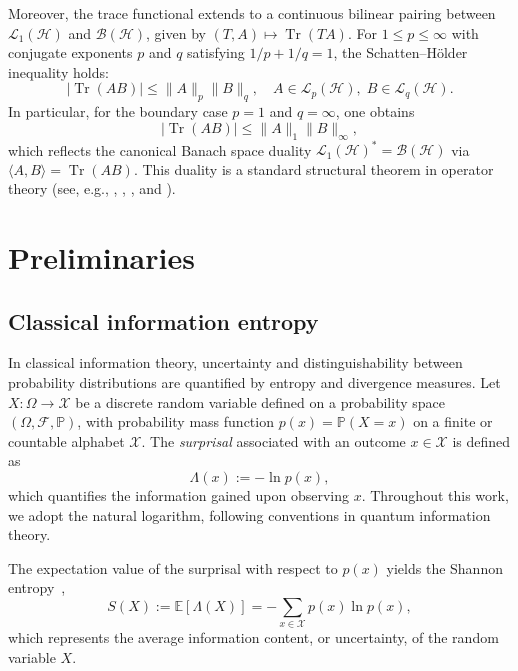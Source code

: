 \documentclass[a4paper, amsfonts, amssymb, amsmath, reprint, showkeys, nofootinbib, twoside, aps, pra]{revtex4-2}
\theoremstyle{definition}
\begin{document}
Moreover, the trace functional extends to a continuous bilinear pairing
between $\mathcal{L}_1(\mathcal{H})$ and $\mathcal{B}(\mathcal{H})$, given by $(T,A) \longmapsto \operatorname{Tr}(TA)$. 
For $1 \le p \le \infty$ with conjugate exponents $p$ and $q$ satisfying $1/p + 1/q = 1$, 
the Schatten--Hölder inequality holds:
\begin{equation}
    |\operatorname{Tr}(AB)| \le \|A\|_p \|B\|_q, \quad A \in \mathcal{L}_p(\mathcal{H}), \; B \in \mathcal{L}_q(\mathcal{H}).
\end{equation}
In particular, for the boundary case $p=1$ and $q=\infty$, one obtains
\begin{equation}
    |\operatorname{Tr}(AB)| \le \|A\|_1 \|B\|_\infty,
\end{equation}
which reflects the canonical Banach space duality $\mathcal{L}_1(\mathcal{H})^* = \mathcal{B}(\mathcal{H})$ via 
$\langle A,B\rangle = \operatorname{Tr}(AB)$. This duality is a standard structural theorem in operator theory 
(see, e.g., \cite[Theorem VI.26]{ReedSimon1980}, \cite[Theorem 1.4]{RecentSchwarzTraceIneq}, \cite{Kittaneh1985}, and \cite{Watrous2018}).

\section{Preliminaries} \label{pre}
\subsection{Classical information entropy}

In classical information theory, uncertainty and distinguishability between probability distributions are quantified by entropy and divergence measures. 
Let $X : \Omega \to \mathcal{X}$ be a discrete random variable defined on a probability space $(\Omega,\mathcal{F},\mathbb{P})$, with probability mass function $p(x)=\mathbb{P}(X=x)$ on a finite or countable alphabet $\mathcal{X}$. 
The \emph{surprisal} associated with an outcome $x \in \mathcal{X}$ is defined as
\begin{equation}\label{surprisal}
\Lambda(x) := -\ln p(x),
\end{equation}
which quantifies the information gained upon observing $x$. 
Throughout this work, we adopt the natural logarithm, following conventions in quantum information theory.

The expectation value of the surprisal with respect to $p(x)$ yields the Shannon entropy~\cite{Shannon1948,ShannonWeaver1964},
\begin{equation}
S(X) := \mathbb{E}[\Lambda(X)]
     = -\sum_{x\in\mathcal{X}} p(x)\ln p(x),
\end{equation}
which represents the average information content, or uncertainty, of the random variable $X$.
\end{document}
